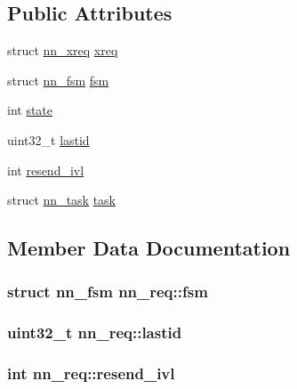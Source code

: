 \subsection*{Public Attributes}
\begin{DoxyCompactItemize}
\item 
struct \hyperlink{structnn__xreq}{nn\+\_\+xreq} \hyperlink{structnn__req_ac749569e351ea1230dd3a3f4dcfc0365}{xreq}
\item 
struct \hyperlink{structnn__fsm}{nn\+\_\+fsm} \hyperlink{structnn__req_a8b087cd8213955e24bb6ab47e7359e26}{fsm}
\item 
int \hyperlink{structnn__req_a7d1ed0a033eb20cc5a76570a9dba10fb}{state}
\item 
uint32\+\_\+t \hyperlink{structnn__req_a9d57a6521d6aba0abea5a09a65561a11}{lastid}
\item 
int \hyperlink{structnn__req_a1c0b9e587e167431580f1509a14c0d0d}{resend\+\_\+ivl}
\item 
struct \hyperlink{structnn__task}{nn\+\_\+task} \hyperlink{structnn__req_a71406ed3e5197e00395a75044b1b23c8}{task}
\end{DoxyCompactItemize}


\subsection{Member Data Documentation}
\subsubsection[{fsm}]{\setlength{\rightskip}{0pt plus 5cm}struct {\bf nn\+\_\+fsm} nn\+\_\+req\+::fsm}\hypertarget{structnn__req_a8b087cd8213955e24bb6ab47e7359e26}{}\label{structnn__req_a8b087cd8213955e24bb6ab47e7359e26}
\subsubsection[{lastid}]{\setlength{\rightskip}{0pt plus 5cm}uint32\+\_\+t nn\+\_\+req\+::lastid}\hypertarget{structnn__req_a9d57a6521d6aba0abea5a09a65561a11}{}\label{structnn__req_a9d57a6521d6aba0abea5a09a65561a11}
\subsubsection[{resend\+\_\+ivl}]{\setlength{\rightskip}{0pt plus 5cm}int nn\+\_\+req\+::resend\+\_\+ivl}\hypertarget{structnn__req_a1c0b9e587e167431580f1509a14c0d0d}{}\label{structnn__req_a1c0b9e587e167431580f1509a14c0d0d}
